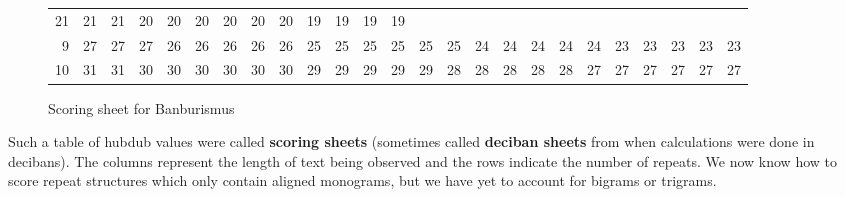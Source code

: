 \begin{figure}[H]
\begin{center}
{\begin{tabular}{r|rrrrrrrrrrrrrrrrrrrrrrrr}
				21  & 21  & 21  & 20  & 20  & 20  & 20  & 20  & 20  & 19  &
				19  & 19  & 19                                                           \\
				9   & 27  & 27  & 27  & 26  & 26  & 26  & 26  & 26  & 25  & 25 & 25 &
				25  & 25  & 25  & 24  & 24  & 24  & 24  & 24  & 23  & 23  &
				23  & 23  & 23                                                           \\
				10  & 31  & 31  & 30  & 30  & 30  & 30  & 30  & 30  & 29  & 29 & 29 &
				29  & 29  & 28  & 28  & 28  & 28  & 28  & 27  & 27  & 27  &
				27  & 27  & 27                                                           \\
			\end{tabular}}
	\end{center}
	\caption{Scoring sheet for Banburismus}
\end{figure}
\noindent Such a table of hubdub values were called {\bf{scoring
			sheets}} (sometimes called {\bf{deciban sheets}} from when
calculations were done in decibans). The columns represent the
length of text being observed and the rows indicate the number of
repeats. We now know how to score repeat structures which only
contain aligned monograms, but we have yet to account for bigrams or trigrams.

